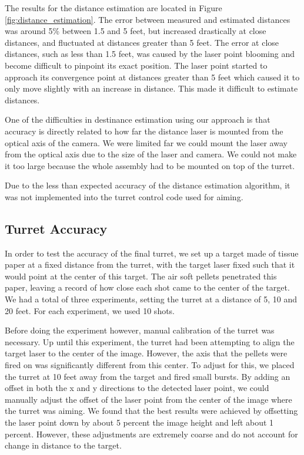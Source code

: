 \documentclass[10pt,twocolumn,letterpaper]{article}
\begin{document}
The results for the distance estimation are located in Figure \ref{fig:distance_estimation}. The error between measured and estimated distances was around 5\% between 1.5 and 5 feet, but increased drastically at close distances, and fluctuated at distances greater than 5 feet. The error at close distances, such as less than 1.5 feet, was caused by the laser point blooming and become difficult to pinpoint its exact position. The laser point started to approach its convergence point at distances greater than 5 feet which caused it to only move slightly with an increase in distance. This made it difficult to estimate distances.

One of the difficulties in destinance estimation using our approach is that accuracy is directly related to how far the distance laser is mounted from the optical axis of the camera. We were limited far we could mount the laser away from the optical axis due to the size of the laser and camera. We could not make it too large because the whole assembly had to be mounted on top of the turret.

Due to the less than expected accuracy of the distance estimation algorithm, it was not implemented into the turret control code used for aiming.

\subsection{Turret Accuracy}

In order to test the accuracy of the final turret, we set up a target made of tissue paper at a fixed distance from the turret, with the target laser fixed such that it would point at the center of this target. The air soft pellets penetrated this paper, leaving a record of how close each shot came to the center of the target. We had a total of three experiments, setting the turret at a distance of 5, 10 and 20 feet. For each experiment, we used 10 shots.

Before doing the experiment however, manual calibration of the turret was necessary. Up until this experiment, the turret had been attempting to align the target laser to the center of the image. However, the axis that the pellets were fired on was significantly different from this center. To adjust for this, we placed the turret at 10 feet away from the target and fired small bursts. By adding an offset in both the x and y directions to the detected laser point, we could manually adjust the offset of the laser point from the center of the image where the turret was aiming.  We found that the best results were achieved by offsetting the laser point down by about 5 percent the image height and left about 1 percent. However, these adjustments are extremely coarse and do not account for change in distance to the target.
\end{document}

